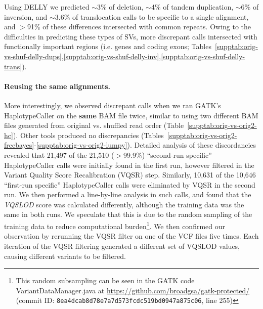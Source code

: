 \documentclass{bioinfo}
\begin{document}
Using DELLY we predicted $\sim$3\% of deletion, $\sim$4\% of tandem duplication, $\sim$6\% of inversion, and $\sim$3.6\% of translocation calls to be specific to a single alignment, and $>$91\% of these differences intersected with common repeats. Owing to the difficulties in predicting
these types of SVs, more discrepant calls intersected with functionally important regions (i.e. genes and coding exons;  Tables~\ref{supptab:orig-vs-shuf-delly-dups},\ref{supptab:orig-vs-shuf-delly-inv},\ref{supptab:orig-vs-shuf-delly-trans}).

\paragraph{Reusing the same alignments.}
More interestingly, we observed discrepant calls when we ran GATK's HaplotypeCaller on the {\bf same} BAM file twice, similar to using two different BAM files generated from original vs. shuffled read order (Table~\ref{supptab:orig-vs-orig2-hc}).
Other tools produced no discrepancies (Tables~\ref{supptab:orig-vs-orig2-freebayes}-\ref{supptab:orig-vs-orig2-lumpy}).
Detailed analysis of these discordancies revealed that  21,497 of the 21,510 ($>$99.9\%) ``second-run specific'' HaplotypeCaller calls were initially found in the first run, however filtered in the Variant Quality Score Recalibration (VQSR) step. Similarly, 10,631 of the 10,646 ``first-run specific'' HaplotypeCaller calls were eliminated by VQSR in the second run. We then performed a line-by-line analysis in such calls, and found that the {\it VQSLOD} score was calculated differently, although the training data was the same in both runs. 
We speculate that this is due to the random sampling of the training data
to reduce computational burden\footnote{This random subsampling can be seen in the GATK code VariantDataManager.java at %
\url{https://github.com/broadgsa/gatk-protected/} (commit ID: {\tt 8ea4dcab8d78e7a7d573fcdc519bd0947a875c06}, line 255)}. 
We then confirmed our observation by rerunning the VQSR filter on 
one of the VCF files five times. Each iteration of the VQSR filtering generated a different set of VQSLOD values, causing different variants to be filtered.

\end{document}
